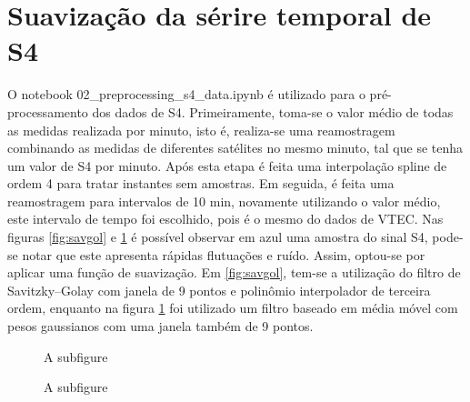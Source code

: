 \section{Suavização da sérire temporal de S4}

O notebook 02\_preprocessing\_s4\_data.ipynb é utilizado para o pré-processamento dos dados de S4. Primeiramente, toma-se o valor médio de todas as medidas realizada por minuto, isto é, realiza-se uma reamostragem combinando as medidas de diferentes satélites no mesmo minuto, tal que se tenha um valor de S4 por minuto. Após esta etapa é feita uma interpolação spline de ordem 4 para tratar instantes sem amostras. Em seguida, é feita uma reamostragem para intervalos de 10 min, novamente utilizando o valor médio, este intervalo de tempo foi escolhido, pois é o mesmo do dados de VTEC. Nas figuras \ref{fig:savgol} e \ref{fig:gaussian} é possível observar em azul uma amostra do sinal S4, pode-se notar que este apresenta rápidas flutuações e ruído. Assim, optou-se por aplicar uma função de suavização. Em \ref{fig:savgol}, tem-se a utilização do filtro de Savitzky–Golay com janela de 9 pontos e polinômio interpolador de terceira ordem, enquanto na figura \ref{fig:gaussian} foi utilizado um filtro baseado em média móvel com pesos gaussianos com uma janela também de 9 pontos.


\begin{figure}[H]
\centering
{}
\caption{A subfigure}
\label{fig:savgol}
\caption{A subfigure}
\label{fig:gaussian}
\end{figure}

